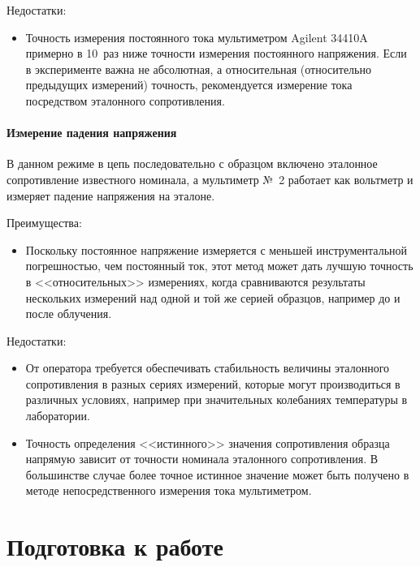 \documentclass[12pt, a4paper, twocolumn]{report}
\begin{document}
Недостатки:

\begin{itemize}
\item Точность измерения постоянного тока мультиметром Agilent 34410A примерно в 10~раз ниже точности измерения постоянного напряжения. Если в эксперименте важна не абсолютная, а относительная (относительно предыдущих измерений) точность, рекомендуется измерение тока посредством эталонного сопротивления.
\end{itemize}

\subsubsection{Измерение падения напряжения}
\label{sec_test_measure}

В данном режиме в цепь последовательно с образцом включено эталонное сопротивление известного номинала, а мультиметр №~2 работает как вольтметр и измеряет падение напряжения на эталоне.

Преимущества:

\begin{itemize}
\item Поскольку постоянное напряжение измеряется с меньшей инструментальной погрешностью, чем постоянный ток, этот метод может дать лучшую точность в <<относительных>> измерениях, когда сравниваются результаты нескольких измерений над одной и той же серией образцов, например до и после облучения.
\end{itemize}

Недостатки:

\begin{itemize}
\item От оператора требуется обеспечивать стабильность величины эталонного сопротивления в разных сериях измерений, которые могут производиться в различных условиях, например при значительных колебаниях температуры в лаборатории.
\item Точность определения <<истинного>> значения сопротивления образца напрямую зависит от точности номинала эталонного сопротивления. В большинстве случае более точное истинное значение может быть получено в методе непосредственного измерения тока мультиметром.
\end{itemize}

\chapter{Подготовка к работе}
\end{document}
